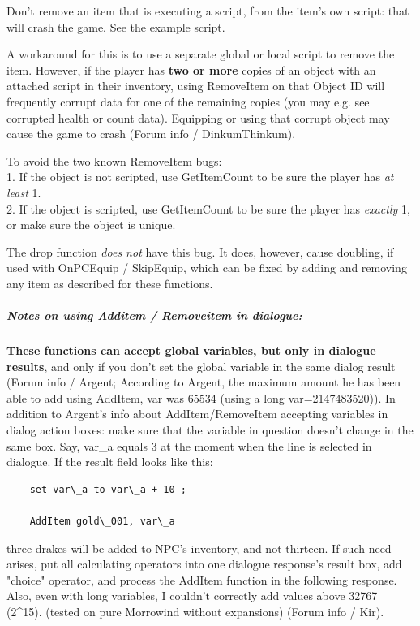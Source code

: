 Don't remove an item that is executing a script, from the item's own
script: that will crash the game. See the example script.

A workaround for this is to use a separate global or local script to
remove the item. However, if the player has \textbf{two or more} copies
of an object with an attached script in their inventory, using
RemoveItem on that Object ID will frequently corrupt data for one of the
remaining copies (you may e.g. see corrupted health or count data).
Equipping or using that corrupt object may cause the game to crash
(Forum info / DinkumThinkum).

To avoid the two known RemoveItem bugs:\\
1. If the object is not scripted, use GetItemCount to be sure the player
has \emph{at least} 1.\\
2. If the object is scripted, use GetItemCount to be sure the player has
\emph{exactly} 1, or make sure the object is unique.

The drop function \emph{does not} have this bug. It does, however, cause
doubling, if used with OnPCEquip / SkipEquip, which can be fixed by
adding and removing any item as described for these functions.

\hypertarget{notes-on-using-additem-removeitem-in-dialogue}{%
\subparagraph{Notes on using Additem / Removeitem in
dialogue:}\label{notes-on-using-additem-removeitem-in-dialogue}}

\textbf{These functions can accept global variables, but only in
dialogue results}, and only if you don't set the global variable in the
same dialog result (Forum info / Argent; According to Argent, the
maximum amount he has been able to add using AddItem, var was 65534
(using a long var=2147483520)). In addition to Argent's info about
AddItem/RemoveItem accepting variables in dialog action boxes: make sure
that the variable in question doesn't change in the same box. Say,
var\_a equals 3 at the moment when the line is selected in dialogue. If
the result field looks like this:

\begin{lstlisting}
	set var\_a to var\_a + 10 ;
	
	AddItem gold\_001, var\_a
\end{lstlisting}

three drakes will be added to NPC's inventory, and not thirteen. If such
need arises, put all calculating operators into one dialogue response's
result box, add "choice" operator, and process the AddItem function in
the following response. Also, even with long variables, I couldn't
correctly add values above 32767 (2\^{}15). (tested on pure Morrowind
without expansions) (Forum info / Kir).

